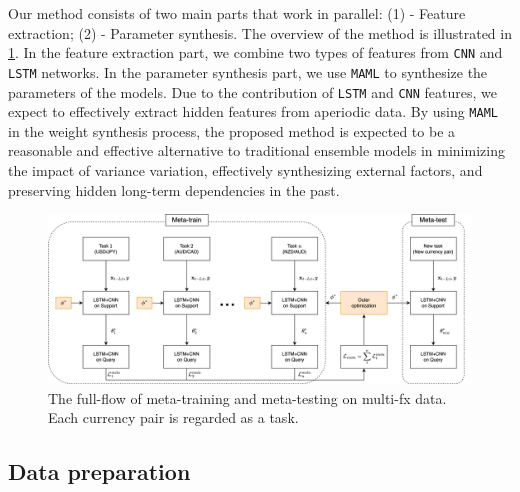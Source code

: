 \documentclass[aps,prb,groupedaddress,twocolumn,showpacs,dvipdfmx,superscriptaddress,pdftex]{revtex4-2}
\begin{document}
Our method consists of two main parts that work in parallel: (1) - Feature extraction; (2) - Parameter synthesis. The overview of the method is illustrated in \ref{fig:flow}. In the feature extraction part, we combine two types of features from \verb|CNN| and \verb|LSTM| networks. In the parameter synthesis part, we use \verb|MAML| to synthesize the parameters of the models. Due to the contribution of \verb|LSTM| and \verb|CNN| features, we expect to effectively extract hidden features from aperiodic data. By using \verb|MAML| in the weight synthesis process, the proposed method is expected to be a reasonable and effective alternative to traditional ensemble models in minimizing the impact of variance variation, effectively synthesizing external factors, and preserving hidden long-term dependencies in the past.

\begin{figure}[ht]
    \centering
    \includegraphics[width=\textwidth]{img/meta.png}
    \caption{The full-flow of meta-training and meta-testing on multi-fx data. Each currency pair is regarded as a task.}
    \label{fig:flow}
\end{figure}

\subsection{Data preparation}

\end{document}
